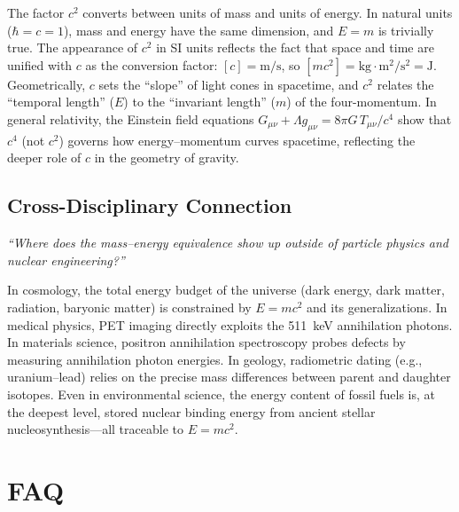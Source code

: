 \documentclass[11pt,openright]{book}
\begin{document}
The factor $c^{2}$ converts between units of mass and units of energy. In natural units ($\hbar = c = 1$), mass and energy have the same dimension, and $E = m$ is trivially true. The appearance of $c^{2}$ in SI units reflects the fact that space and time are unified with $c$ as the conversion factor: $[c] = \text{m/s}$, so $[mc^{2}] = \text{kg} \cdot \text{m}^{2}/\text{s}^{2} = \text{J}$. Geometrically, $c$ sets the ``slope'' of light cones in spacetime, and $c^{2}$ relates the ``temporal length'' ($E$) to the ``invariant length'' ($m$) of the four-momentum. In general relativity, the Einstein field equations $G_{\mu\nu} + \Lambda g_{\mu\nu} = 8\pi G\,T_{\mu\nu}/c^{4}$ show that $c^{4}$ (not $c^{2}$) governs how energy--momentum curves spacetime, reflecting the deeper role of $c$ in the geometry of gravity.

\subsection*{Cross-Disciplinary Connection}
\textit{``Where does the mass--energy equivalence show up outside of particle physics and nuclear engineering?''}

In cosmology, the total energy budget of the universe (dark energy, dark matter, radiation, baryonic matter) is constrained by $E = mc^{2}$ and its generalizations. In medical physics, PET imaging directly exploits the 511~keV annihilation photons. In materials science, positron annihilation spectroscopy probes defects by measuring annihilation photon energies. In geology, radiometric dating (e.g., uranium--lead) relies on the precise mass differences between parent and daughter isotopes. Even in environmental science, the energy content of fossil fuels is, at the deepest level, stored nuclear binding energy from ancient stellar nucleosynthesis---all traceable to $E = mc^{2}$.

\section*{FAQ}
\end{document}
